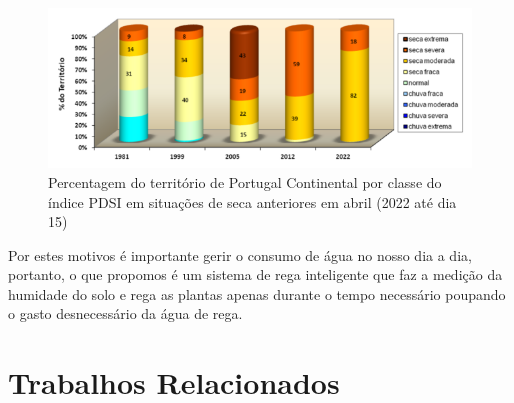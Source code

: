 \documentclass[conference]{IEEEtran}
\begin{document}
\begin{figure}[h]
    \centering
    \includegraphics[scale=0.5]{grafico-seca-portugal.png}
    \caption{Percentagem do território de Portugal Continental por classe do índice PDSI em situações de seca anteriores em abril (2022 até dia 15)}
    \label{fig:ipmagraph}
\end{figure}

Por estes motivos é importante gerir o consumo de água no nosso dia a dia,
portanto, o que propomos é um sistema de rega inteligente que faz a
medição da humidade do solo e rega as plantas apenas durante o tempo
necessário poupando o gasto desnecessário da água de rega.

\section{Trabalhos Relacionados}
\end{document}
